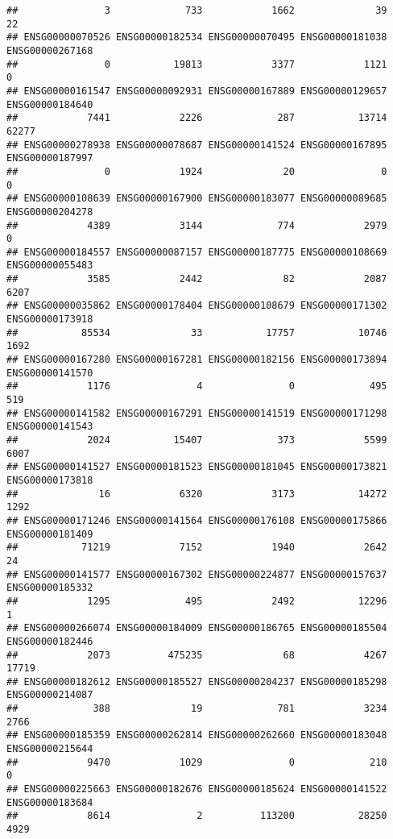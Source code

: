 \documentclass[
]{article}
\begin{document}
\begin{verbatim}
##               3             733            1662              39              22 
## ENSG00000070526 ENSG00000182534 ENSG00000070495 ENSG00000181038 ENSG00000267168 
##               0           19813            3377            1121               0 
## ENSG00000161547 ENSG00000092931 ENSG00000167889 ENSG00000129657 ENSG00000184640 
##            7441            2226             287           13714           62277 
## ENSG00000278938 ENSG00000078687 ENSG00000141524 ENSG00000167895 ENSG00000187997 
##               0            1924              20               0               0 
## ENSG00000108639 ENSG00000167900 ENSG00000183077 ENSG00000089685 ENSG00000204278 
##            4389            3144             774            2979               0 
## ENSG00000184557 ENSG00000087157 ENSG00000187775 ENSG00000108669 ENSG00000055483 
##            3585            2442              82            2087            6207 
## ENSG00000035862 ENSG00000178404 ENSG00000108679 ENSG00000171302 ENSG00000173918 
##           85534              33           17757           10746            1692 
## ENSG00000167280 ENSG00000167281 ENSG00000182156 ENSG00000173894 ENSG00000141570 
##            1176               4               0             495             519 
## ENSG00000141582 ENSG00000167291 ENSG00000141519 ENSG00000171298 ENSG00000141543 
##            2024           15407             373            5599            6007 
## ENSG00000141527 ENSG00000181523 ENSG00000181045 ENSG00000173821 ENSG00000173818 
##              16            6320            3173           14272            1292 
## ENSG00000171246 ENSG00000141564 ENSG00000176108 ENSG00000175866 ENSG00000181409 
##           71219            7152            1940            2642              24 
## ENSG00000141577 ENSG00000167302 ENSG00000224877 ENSG00000157637 ENSG00000185332 
##            1295             495            2492           12296               1 
## ENSG00000266074 ENSG00000184009 ENSG00000186765 ENSG00000185504 ENSG00000182446 
##            2073          475235              68            4267           17719 
## ENSG00000182612 ENSG00000185527 ENSG00000204237 ENSG00000185298 ENSG00000214087 
##             388              19             781            3234            2766 
## ENSG00000185359 ENSG00000262814 ENSG00000262660 ENSG00000183048 ENSG00000215644 
##            9470            1029               0             210               0 
## ENSG00000225663 ENSG00000182676 ENSG00000185624 ENSG00000141522 ENSG00000183684 
##            8614               2          113200           28250            4929 

\end{verbatim}
\end{document}
